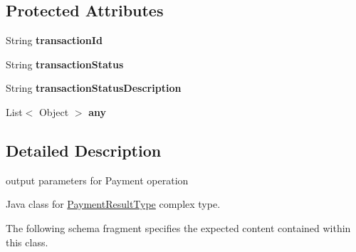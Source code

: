 \subsection*{Protected Attributes}
\begin{DoxyCompactItemize}
\item 
\hypertarget{classcom_1_1telefonica_1_1schemas_1_1unica_1_1rpc_1_1payment_1_1v1_1_1PaymentResultType_a11bf8e4d386094437da515f496e586b3}{
String {\bfseries transactionId}}
\label{classcom_1_1telefonica_1_1schemas_1_1unica_1_1rpc_1_1payment_1_1v1_1_1PaymentResultType_a11bf8e4d386094437da515f496e586b3}

\item 
\hypertarget{classcom_1_1telefonica_1_1schemas_1_1unica_1_1rpc_1_1payment_1_1v1_1_1PaymentResultType_a526bf3f49d492f07545aa996a3befc0b}{
String {\bfseries transactionStatus}}
\label{classcom_1_1telefonica_1_1schemas_1_1unica_1_1rpc_1_1payment_1_1v1_1_1PaymentResultType_a526bf3f49d492f07545aa996a3befc0b}

\item 
\hypertarget{classcom_1_1telefonica_1_1schemas_1_1unica_1_1rpc_1_1payment_1_1v1_1_1PaymentResultType_a23b5dadd2ec1133c308994b610068578}{
String {\bfseries transactionStatusDescription}}
\label{classcom_1_1telefonica_1_1schemas_1_1unica_1_1rpc_1_1payment_1_1v1_1_1PaymentResultType_a23b5dadd2ec1133c308994b610068578}

\item 
\hypertarget{classcom_1_1telefonica_1_1schemas_1_1unica_1_1rpc_1_1payment_1_1v1_1_1PaymentResultType_a837ace9f170b5b34e9f162e42dcc1d2a}{
List$<$ Object $>$ {\bfseries any}}
\label{classcom_1_1telefonica_1_1schemas_1_1unica_1_1rpc_1_1payment_1_1v1_1_1PaymentResultType_a837ace9f170b5b34e9f162e42dcc1d2a}

\end{DoxyCompactItemize}


\subsection{Detailed Description}
output parameters for Payment operation

Java class for \hyperlink{classcom_1_1telefonica_1_1schemas_1_1unica_1_1rpc_1_1payment_1_1v1_1_1PaymentResultType}{PaymentResultType} complex type.

The following schema fragment specifies the expected content contained within this class.


